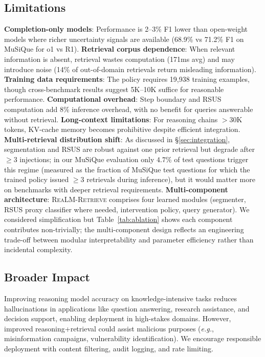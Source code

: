\documentclass[sigconf,natbib=true]{acmart}
\newcommand{\methodname}{\textsc{ReaLM-Retrieve}}
\newcommand{\eg}{\textit{e.g.}}
\begin{document}
\subsection{Limitations}
\label{sec:limitations}
\textbf{Completion-only models}: Performance is 2--3\% F1 lower than open-weight models where richer uncertainty signals are available (68.9\% vs 71.2\% F1 on MuSiQue for o1 vs R1). \textbf{Retrieval corpus dependence}: When relevant information is absent, retrieval wastes computation (171ms avg) and may introduce noise (14\% of out-of-domain retrievals return misleading information). \textbf{Training data requirements}: The policy requires 19,938 training examples, though cross-benchmark results suggest 5K--10K suffice for reasonable performance. \textbf{Computational overhead}: Step boundary and RSUS computation add 8\% inference overhead, with no benefit for queries answerable without retrieval. \textbf{Long-context limitations}: For reasoning chains $>$30K tokens, KV-cache memory becomes prohibitive despite efficient integration. \textbf{Multi-retrieval distribution shift}: As discussed in \S\ref{sec:integration}, segmentation and RSUS are robust against one prior retrieval but degrade after $\ge 3$ injections; in our MuSiQue evaluation only $4.7$\% of test questions trigger this regime (measured as the fraction of MuSiQue test questions for which the trained policy issued $\ge 3$ retrievals during inference), but it would matter more on benchmarks with deeper retrieval requirements. \textbf{Multi-component architecture}: \methodname{} comprises four learned modules (segmenter, RSUS proxy classifier where needed, intervention policy, query generator). We considered simplification but Table~\ref{tab:ablation} shows each component contributes non-trivially; the multi-component design reflects an engineering trade-off between modular interpretability and parameter efficiency rather than incidental complexity.

\subsection{Broader Impact}
Improving reasoning model accuracy on knowledge-intensive tasks reduces hallucinations in applications like question answering, research assistance, and decision support, enabling deployment in high-stakes domains. However, improved reasoning+retrieval could assist malicious purposes (\eg, misinformation campaigns, vulnerability identification). We encourage responsible deployment with content filtering, audit logging, and rate limiting.
\end{document}

